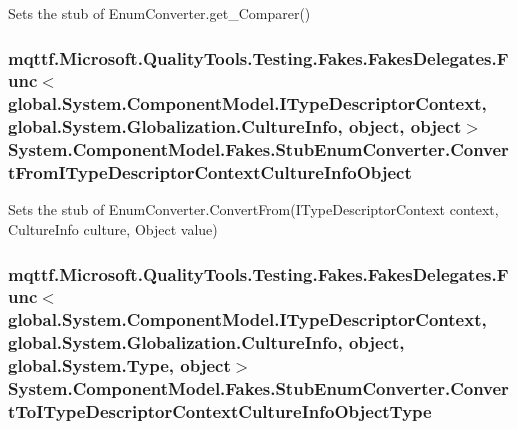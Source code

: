 Sets the stub of Enum\-Converter.\-get\-\_\-\-Comparer()

\hypertarget{class_system_1_1_component_model_1_1_fakes_1_1_stub_enum_converter_a1d8a8285f8eedf20bddcdae6d14a2933}{
\subsubsection[{Convert\-From\-I\-Type\-Descriptor\-Context\-Culture\-Info\-Object}]{\setlength{\rightskip}{0pt plus 5cm}mqttf.\-Microsoft.\-Quality\-Tools.\-Testing.\-Fakes.\-Fakes\-Delegates.\-Func$<$global.\-System.\-Component\-Model.\-I\-Type\-Descriptor\-Context, global.\-System.\-Globalization.\-Culture\-Info, object, object$>$ System.\-Component\-Model.\-Fakes.\-Stub\-Enum\-Converter.\-Convert\-From\-I\-Type\-Descriptor\-Context\-Culture\-Info\-Object}}\label{class_system_1_1_component_model_1_1_fakes_1_1_stub_enum_converter_a1d8a8285f8eedf20bddcdae6d14a2933}


Sets the stub of Enum\-Converter.\-Convert\-From(\-I\-Type\-Descriptor\-Context context, Culture\-Info culture, Object value)

\hypertarget{class_system_1_1_component_model_1_1_fakes_1_1_stub_enum_converter_a40109870e61b22f88ababdc17bd63daa}{
\subsubsection[{Convert\-To\-I\-Type\-Descriptor\-Context\-Culture\-Info\-Object\-Type}]{\setlength{\rightskip}{0pt plus 5cm}mqttf.\-Microsoft.\-Quality\-Tools.\-Testing.\-Fakes.\-Fakes\-Delegates.\-Func$<$global.\-System.\-Component\-Model.\-I\-Type\-Descriptor\-Context, global.\-System.\-Globalization.\-Culture\-Info, object, global.\-System.\-Type, object$>$ System.\-Component\-Model.\-Fakes.\-Stub\-Enum\-Converter.\-Convert\-To\-I\-Type\-Descriptor\-Context\-Culture\-Info\-Object\-Type}}\label{class_system_1_1_component_model_1_1_fakes_1_1_stub_enum_converter_a40109870e61b22f88ababdc17bd63daa}


